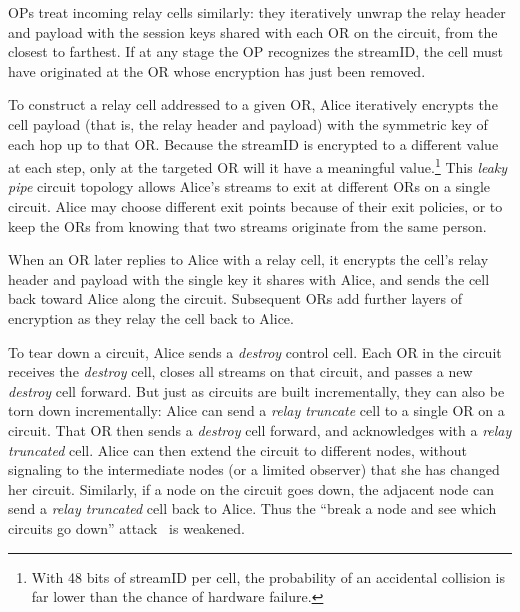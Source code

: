 \documentclass[times,10pt,twocolumn]{article}
\begin{document}
OPs treat incoming relay cells similarly: they iteratively unwrap the
relay header and payload with the session keys shared with each
OR on the circuit, from the closest to farthest. %
If at any stage the OP recognizes the streamID, the cell must have
originated at the OR whose encryption has just been removed.

To construct a relay cell addressed to a given OR, Alice iteratively
encrypts the cell payload (that is, the relay header and payload) with
the symmetric key of each hop up to that OR.  Because the streamID is
encrypted to a different value at each step, only at the targeted OR
will it have a meaningful value.\footnote{
With 48 bits of streamID per cell, the probability of an accidental
collision is far lower than the chance of hardware failure.}
This \emph{leaky pipe} circuit topology
allows Alice's streams to exit at different ORs on a single circuit.
Alice may choose different exit points because of their exit policies,
or to keep the ORs from knowing that two streams
originate from the same person.

When an OR later replies to Alice with a relay cell, it
encrypts the cell's relay header and payload with the single key it
shares with Alice, and sends the cell back toward Alice along the
circuit.  Subsequent ORs add further layers of encryption as they
relay the cell back to Alice.

To tear down a circuit, Alice sends a \emph{destroy} control
cell. Each OR in the circuit receives the \emph{destroy} cell, closes
all streams on that circuit, and passes a new \emph{destroy} cell
forward. But just as circuits are built incrementally, they can also
be torn down incrementally: Alice can send a \emph{relay
truncate} cell to a single OR on a circuit. That OR then sends a
\emph{destroy} cell forward, and acknowledges with a
\emph{relay truncated} cell. Alice can then extend the circuit to
different nodes, without signaling to the intermediate nodes (or
a limited observer) that she has changed her circuit.
Similarly, if a node on the circuit goes down, the adjacent
node can send a \emph{relay truncated} cell back to Alice.  Thus the
``break a node and see which circuits go down''
attack~\cite{freedom21-security} is weakened.
\end{document}

